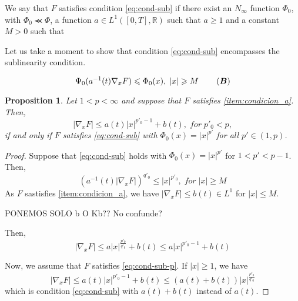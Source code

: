\documentclass[twoside]{article}
\newtheorem{prop}[thm]{Proposition}
\theoremstyle{remark}
\renewcommand{\b}[1]{\boldsymbol{#1}}
\newcommand{\rr}{\mathbb{R}}
\renewcommand{\leq}{\leqslant}
\renewcommand{\geq}{\geqslant}
\begin{document}
We say that $F$ satisfies condition \eqref{eq:cond-sub} if there exist an $N_{\infty}$ function $\Phi_0$, with $\Phi_0 \llcurly \Phi$,
a function $a \in  L^1([0,T],\rr)$ such that $a\geq 1$ and a constant $M>0$ such that


Let us take a moment to show that condition \eqref{eq:cond-sub} encompasses the sublinearity condition. 


\begin{equation}\label{eq:cond-sub}
  \Psi_0(a^{-1}(t)\nabla_x F)\leq \Phi_0(x),\;|x|\geq M\,\tag{$\b{B}$}
\end{equation}

\begin{prop}
Let $1<p<\infty$ and suppose that $F$ satisfies  \ref{item:condicion_a}. Then,
\begin{equation}\label{eq:cond-sub-p}
|\nabla_x F|\leq a(t)|x|^{p'_0-1}+b(t),\;for\; p'_0<p,
\end{equation}
 if and only if
$F$ satisfies \eqref{eq:cond-sub} with $\Phi_0(x)=|x|^{p'}$ for all $p'\in(1,p)$.
\end{prop}

\begin{proof}
Suppose that \eqref{eq:cond-sub} holds with $\Phi_0(x)=|x|^{p'}$ for $1<p'<p-1$. Then,
\[
(a^{-1}(t)|\nabla_x F|)^{q'_0}\leq |x|^{p'_0},\;for\; |x|\geq M
\]
As $F$ sastisfies \ref{item:condicion_a}, we have
$|\nabla_x F|\leq b(t)\in L^1$ for $|x|\leq M$.

PONEMOS SOLO b O Kb?? No confunde?

Then,
\[
|\nabla_x F|\leq a |x|^{\frac{p'_0}{q'_0}}+b(t)\leq a|x|^{p'_0-1}+b(t)
\]

Now, we assume that $F$ satisfies \eqref{eq:cond-sub-p}. If $|x|\geq 1$, we have
\[
|\nabla_x F|\leq a(t)|x|^{p'_0-1}+b(t)\leq (a(t)+b(t))|x|^{\frac{p'_0}{q'_0}}
\]
which is condition \eqref{eq:cond-sub} with $a(t)+b(t)$ instead of $a(t)$.
\end{proof}
\end{document}
